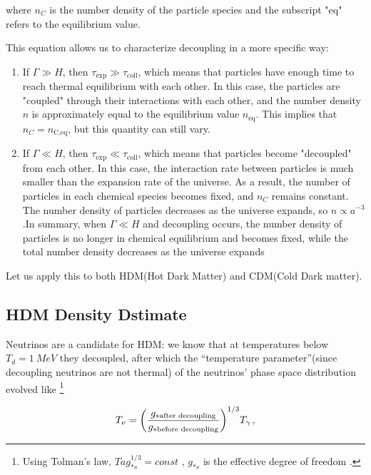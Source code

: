 where $n_C$ is the number density of the particle species and the subscript "eq" refers to the equilibrium value.

This equation allows us to characterize decoupling in a more specific way:
\begin{enumerate}
    \item If $\Gamma \gg H$, then $\tau_{\text{exp}} \gg \tau_{\text{coll}}$, which means that particles have enough time to reach thermal equilibrium with each other. In this case, the particles are "coupled" through their interactions with each other, and the number density $n$ is approximately equal to the equilibrium value $n_{\text{eq}}$. This implies that $n_C = n_{\text{C,eq}}$, but this quantity can still vary.
    \item If $\Gamma \ll H$, then $\tau_{\text{exp}} \ll \tau_{\text{coll}}$, which means that particles become "decoupled" from each other. In this case, the interaction rate between particles is much smaller than the expansion rate of the universe. As a result, the number of particles in each chemical species becomes fixed, and $n_C$ remains constant. The number density of particles decreases as the universe expands, so $n \propto a^{-3}$.In summary, when $\Gamma \ll H$ and decoupling occurs, the number density of particles is no longer in chemical equilibrium and becomes fixed, while the total number density decreases as the universe expands
\end{enumerate}




Let us apply this to both HDM(Hot Dark Matter) and CDM(Cold Dark matter).

\subsection{HDM Density Dstimate}

\hspace{0.5cm}Neutrinos are a candidate for HDM: we know that at temperatures below \(T_d = \SI{1}{MeV}\) they decoupled, after which the ``temperature parameter''(since decoupling neutrinos are not thermal) of the neutrinos' phase space distribution evolved like \footnote{Using Tolman's law, \(T a g_{*s}^{1/3} = const\) , \(g_{*s} \) is the effective degree of freedom .}

\begin{align}
    T_{\nu } = \qty(\frac{g_{* \text{after decoupling}}}{g_{* \text{before decoupling}}})^{1/3} T_{\gamma }\,,
\end{align}

